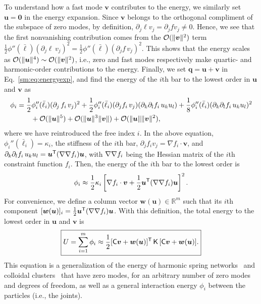 To understand how a fast mode $\bm{v}$ contributes to the energy, we similarly set $\bm{u} = \bm{0}$ in the energy expansion.
Since $\bm{v}$ belongs to the orthogonal compliment of the subspace of zero modes, by definition, $\partial_j \ell v_j = \partial_j f v_j \ne 0$.
Hence, we see that the first nonvanishing contribution comes from the $\mathcal{O}(\lVert\bm{v}\rVert^2)$ term $\frac{1}{2}\phi''(\bar{\ell})(\partial_j \ell\, v_j)^2 = \frac{1}{2}\phi''(\bar{\ell})(\partial_j f\, v_j)^2$.
This shows that the energy scales as $\mathcal{O}(\lVert\bm{u}\rVert^4) \sim \mathcal{O}(\lVert\bm{v}\rVert^2)$, i.e., zero and fast modes respectively make quartic- and harmonic-order contributions to the energy.
Finally, we set $\bm{q} = \bm{u} + \bm{v}$ in Eq.~\eqref{sm:eq:energyexp}, and find the energy of the $i$th bar to the lowest order in $\bm{u}$ and $\bm{v}$ as
%
\begin{equation}
  \begin{aligned}
    \phi_i &= \frac{1}{2}\phi_i''(\bar{\ell}_i)(\partial_j\, f_i\, v_j)^2 + \frac{1}{2}\phi''_i(\bar{\ell}_i)(\partial_j f_i\, v_j)(\partial_k \partial_l f_i\, u_k u_l) + \frac{1}{8}\phi''_i(\bar{\ell}_i)(\partial_k \partial_l f_i\, u_k u_l)^2\\
           &\qquad+ \mathcal{O}(\lVert\bm{u}\rVert^5) + \mathcal{O}(\lVert\bm{u}\rVert^{3}\lVert\bm{v}\rVert) +\mathcal{O}(\lVert\bm{u}\rVert\lVert\bm{v}\rVert^{2}),
  \end{aligned}
\end{equation}
%
where we have reintroduced the free index $i$.
In the above equation, $\phi_{i}''(\bar{\ell}_i) = \kappa_i$, the stiffness of the $i$th bar, $\partial_j f_i v_j = \nabla f_i\cdot\bm{v}$, and $\partial_k\partial_l f_i\, u_k u_l = \bm{u}^\mathsf{T}(\nabla\nabla f_i)\bm{u}$, with $\nabla\nabla f_i$ being the Hessian matrix of the $i$th constraint function $f_i$.
Then, the energy of the $i$th bar to the lowest order is
%
\begin{equation}
  \phi_i \approx \frac{1}{2}\kappa_i \left[\nabla f_i\cdot\bm{v} + \frac{1}{2}\bm{u}^\mathsf{T}(\nabla\nabla f_i)\bm{u}\right]^2.
\end{equation}
%
For convenience, we define a column vector $\bm{w}(\bm{u}) \in \mathbb{R}^{m}$ such that its $i$th component $[\bm{w}(\bm{u})]_{i} = \frac{1}{2}\bm{u}^\mathsf{T}(\nabla\nabla f_{i})\bm{u}$.
With this definition, the total energy to the lowest order in $\bm{u}$ and $\bm{v}$ is
%
\begin{equation}\boxed{%
  U = \sum_{i=1}^m \phi_i \approx \frac{1}{2} [\mathsf{C}\bm{v} + \bm{w}(\bm{u})]\trans\,\mathsf{K}\,[\mathsf{C}\bm{v} + \bm{w}(\bm{u})].}
  \label{eq:energy_singular}
\end{equation}
%
This equation is a generalization of the energy of harmonic spring networks~\cite{zhang2016,woodhouse2018} and colloidal clusters~\cite{kallus2017} that have zero modes, for an arbitrary number of zero modes and degrees of freedom, as well as a general interaction energy $\phi_{i}$ between the particles (i.e., the joints).

